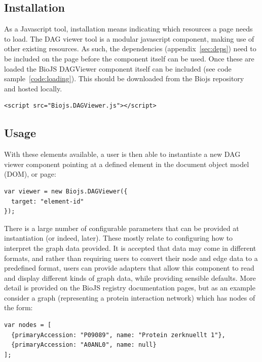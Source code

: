 \documentclass[10pt,a4paper,twocolumn]{article}
\begin{document}
\subsection*{Installation}

As a Javascript tool, installation means indicating which resources a page needs to load.
The DAG viewer tool is a modular javascript component, making use of other
existing resources. As such, the dependencies (appendix~\ref{sec:deps}) need to be included
on the page before the component itself can be used. 
Once these are loaded the BioJS DAGViewer component itself can be included (see code
sample~\ref{code:loading}).
This should be downloaded from the Biojs repository~\cite{site:biojs-registry}
and hosted locally.

\begin{lstlisting}[caption={Loading the DAG-Viewer Library}, label={code:loading}]
<script src="Biojs.DAGViewer.js"></script>
\end{lstlisting}

\subsection*{Usage}

With these elements available, a user is then able to instantiate a new DAG viewer component
pointing at a defined element in the document object model (DOM), or page:

\begin{lstlisting}[caption={Instantiating a new DAGViewer Component}, label={code:new}]
var viewer = new Biojs.DAGViewer({
  target: "element-id"
});
\end{lstlisting}

There is a large number of configurable parameters that can be provided at instantiation
(or indeed, later). These mostly relate to configuring how to interpret the graph data
provided. It is accepted that data may come in different formats, and rather than requiring
users to convert their node and edge data to a predefined format, users can provide adapters
that allow this component to read and display different kinds of graph data, while providing
sensible defaults. More detail is provided on the BioJS registry documentation pages, but as
an example consider a graph (representing a protein interaction network) which has nodes of the form:

\begin{lstlisting}[caption={Example Nodes}, label={code:example-nodes}]
var nodes = [
  {primaryAccession: "P09089", name: "Protein zerknuellt 1"},
  {primaryAccession: "A0ANL0", name: null}
];
\end{lstlisting}
\end{document}
